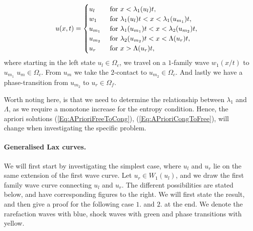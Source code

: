\documentclass[10pt]{article}
\numberwithin{equation}{section}
\begin{document}
\begin{align}
    u(x,t) = \begin{cases}
        u_l & \text{ for $ x < \lambda_1(u_l)t$}, \\
        w_1 & \text{ for $ \lambda_1(u_l)t < x < \lambda_1(u_{m_1})t$}, \\
        u_{m_1} & \text{ for $ \lambda_1(u_{m_1})t < x < \lambda_2(u_{m_2})t$}, \\
        u_{m_2} & \text{ for $ \lambda_2(u_{m_2})t < x < \Lambda( u_r)t $}, \\
        u_r & \text{ for $x > \Lambda( u_r)t$},
    \end{cases}
    \label{Eq:APrioriCongToFree}
\end{align}
where starting in the left state $u_l \in \Omega_c$, we travel on a $1$-family wave $w_1(x/t)$ to $u_{m_1}$ $u_m \in \Omega_c$. From $u_m$ we take the $2$-contact to $u_{m_2} \in \Omega_c$. And lastly we have a phase-transition from $u_{m_2}$ to $u_r \in \Omega_f$. 

Worth noting here, is that we need to determine the relationship between $\lambda_1$ and $\Lambda$, as we require a monotone increase for the entropy condition. Hence, the apriori solutions (\ref{Eq:APrioriFreeToCong}), (\ref{Eq:APrioriCongToFree}), will change when investigating the specific problem. 



\paragraph{Generalised Lax curves.}
We will first start by investigating the simplest case, where $u_l$ and $u_r$ lie on the same extension of the first wave curve. Let $ u_r \in W_1(u_l)$, and we draw the first family wave curve connecting $u_l$ and $u_r$. The different possibilities are stated below, and have corresponding figures to the right. We will first state the result, and then give a proof for the following case $1.$ and $2.$ at the end. We denote the rarefaction waves with blue, shock waves with green and phase transitions with yellow.  
\end{document}
